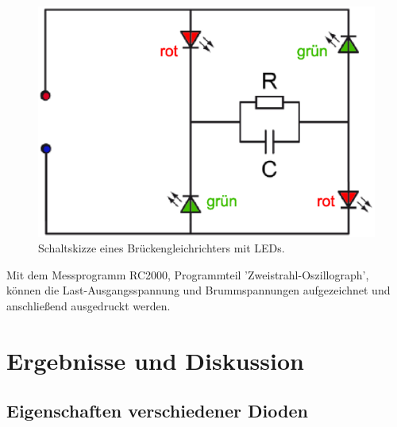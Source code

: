 \documentclass[12pt,a4paper,twopage]{article}
\begin{document}
\begin{center}
\begin{figure}[H]
\includegraphics[scale=0.4]{gleichrichter.eps}
\caption{Schaltskizze eines Brückengleichrichters mit LEDs.}
\label{fig:gleichrichter}
\end{figure}
\end{center}

Mit dem Messprogramm RC2000, Programmteil 'Zweistrahl-Oszillograph', können die Last-Ausgangsspannung und Brummspannungen aufgezeichnet und anschließend ausgedruckt werden.

\section{Ergebnisse und Diskussion}
\subsection{Eigenschaften verschiedener Dioden}
\end{document}
